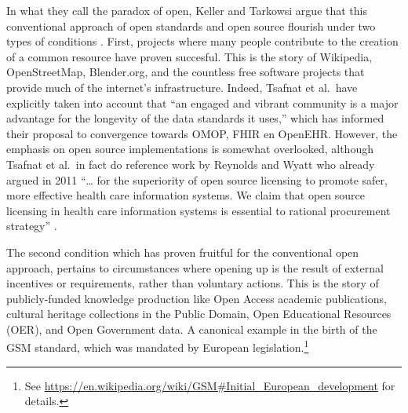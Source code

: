 \documentclass[
  authoryear]{elsarticle}
\begin{document}
In what they call the paradox of open, Keller and Tarkowsi argue that
this conventional approach of open standards and open source flourish
under two types of conditions \citep{keller2021paradox}. First, projects
where many people contribute to the creation of a common resource have
proven succesful. This is the story of Wikipedia, OpenStreetMap,
Blender.org, and the countless free software projects that provide much
of the internet's infrastructure. Indeed, Tsafnat et al.~have explicitly
taken into account that ``an engaged and vibrant community is a major
advantage for the longevity of the data standards it uses,'' which has
informed their proposal to convergence towards OMOP, FHIR en OpenEHR.
However, the emphasis on open source implementations is somewhat
overlooked, although Tsafnat et al.~in fact do reference work by
Reynolds and Wyatt who already argued in 2011 ``\ldots{} for the
superiority of open source licensing to promote safer, more effective
health care information systems. We claim that open source licensing in
health care information systems is essential to rational procurement
strategy'' \citep{reynolds2011open}.

The second condition which has proven fruitful for the conventional open
approach, pertains to circumstances where opening up is the result of
external incentives or requirements, rather than voluntary actions. This
is the story of publicly-funded knowledge production like Open Access
academic publications, cultural heritage collections in the Public
Domain, Open Educational Resources (OER), and Open Government data. A
canonical example in the birth of the GSM standard, which was mandated
by European legislation.\footnote{See
  \url{https://en.wikipedia.org/wiki/GSM\#Initial_European_development}
  for details.}
\end{document}

